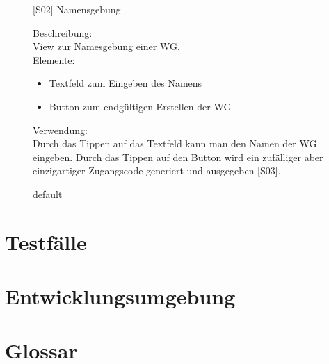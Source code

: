 \documentclass[a4paper]{scrreprt}
\begin{document}
    	\begin{figure}[h!]
    		\begin{minipage}[b]{0.4\linewidth}
    			\flushright
    			\centering
    			\caption{default}
    			\label{fig:figure1}
    		\end{minipage}
    		\hspace{0.5cm}
    		\begin{minipage}[b]{0.55\linewidth}
    			\flushleft
    			
    			{[}S02{]} Namensgebung
    			
    			Beschreibung: \\
    			View zur Namesgebung einer WG.
    			\\
    			Elemente:
    			\begin{itemize}
    				\item Textfeld zum Eingeben des Namens
    				\item Button zum endgültigen Erstellen der WG
    				
    			\end{itemize}
    			
    			Verwendung:\\
    			Durch das Tippen auf das Textfeld kann man
    			den Namen der WG eingeben.
    			Durch das Tippen auf den Button wird ein 
    			zufälliger aber einzigartiger Zugangscode 
    			generiert und ausgegeben {[}S03{]}.
    			
    			
    			
    		\end{minipage}
    	\end{figure}

    \chapter{Testfälle}
    
    \chapter{Entwicklungsumgebung}

	\chapter{Glossar}
	
    \glsaddall
    \printglossaries

    \listoffigures
\end{document}
